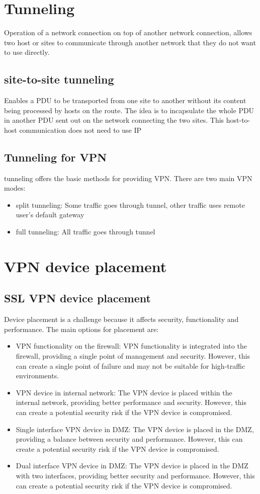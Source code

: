 \section{Tunneling}
Operation of a network connection on top of another network connection, allows two host or sites to communicate through another network that they do not want to use directly.
\subsection{site-to-site tunneling}
Enables a PDU to be transported from one site to another without its content
being processed by hosts on the route. The idea is to incapsulate the whole PDU in another PDU sent out on the network connecting the two sites.
This host-to-host communication does not need to use IP

\subsection{Tunneling for VPN}
tunneling offers the basic methods for providing VPN.
There are two main VPN modes:
\begin{itemize}
    \item split tunneling: Some traffic goes through tunnel, other traffic uses remote user’s default gateway
    \item full tunneling: All traffic goes through tunnel
\end{itemize}

\section{VPN device placement}
\subsection{SSL VPN device placement}
Device placement is a challenge because it affects security, functionality and performance.
The main options for placement are:
\begin{itemize}
    \item VPN functionality on the firewall: VPN functionality is integrated into the firewall, providing a single point of management and security. However, this can create a single point of failure and may not be suitable for high-traffic environments.
    \item VPN device in internal network: The VPN device is placed within the internal network, providing better performance and security. However, this can create a potential security risk if the VPN device is compromised.
    \item Single interface VPN device in DMZ: The VPN device is placed in the DMZ, providing a balance between security and performance. However, this can create a potential security risk if the VPN device is compromised.
    \item Dual interface VPN device in DMZ: The VPN device is placed in the DMZ with two interfaces, providing better security and performance. However, this can create a potential security risk if the VPN device is compromised.
\end{itemize}


